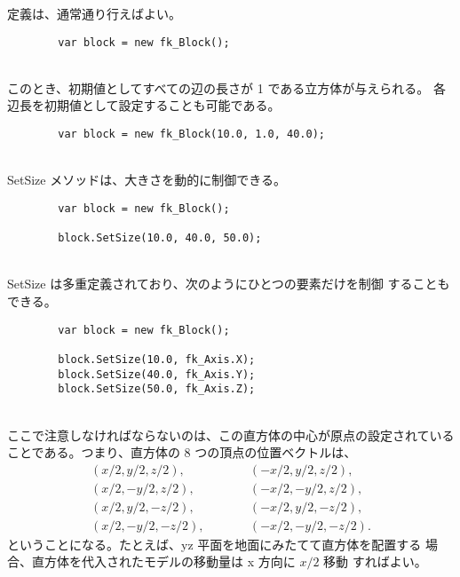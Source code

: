 定義は、通常通り行えばよい。
\\
\begin{screen}
\begin{verbatim}
        var block = new fk_Block();
\end{verbatim}
\end{screen}
~ \\
このとき、初期値としてすべての辺の長さが 1 である立方体が与えられる。
各辺長を初期値として設定することも可能である。
\\
\begin{screen}
\begin{verbatim}
        var block = new fk_Block(10.0, 1.0, 40.0);
\end{verbatim}
\end{screen}
~ \\
SetSize メソッドは、大きさを動的に制御できる。
\\
\begin{screen}
\begin{verbatim}
        var block = new fk_Block();

        block.SetSize(10.0, 40.0, 50.0);
\end{verbatim}
\end{screen}
~ \\
SetSize は多重定義されており、次のようにひとつの要素だけを制御
することもできる。
\\
\begin{breakbox}
\begin{verbatim}
        var block = new fk_Block();

        block.SetSize(10.0, fk_Axis.X);
        block.SetSize(40.0, fk_Axis.Y);
        block.SetSize(50.0, fk_Axis.Z);
\end{verbatim}
\end{breakbox}
~ \\
ここで注意しなければならないのは、この直方体の中心が原点の設定されている
ことである。つまり、直方体の 8 つの頂点の位置ベクトルは、
\begin{eqnarray*}
        (x/2, y/2, z/2), & \qquad & (-x/2, y/2, z/2), \\
        (x/2, -y/2, z/2), & \qquad & (-x/2, -y/2, z/2), \\
        (x/2, y/2, -z/2), & \qquad & (-x/2, y/2, -z/2), \\
        (x/2, -y/2, -z/2), & \qquad & (-x/2, -y/2, -z/2).
\end{eqnarray*}
ということになる。たとえば、yz 平面を地面にみたてて直方体を配置する
場合、直方体を代入されたモデルの移動量は x 方向に \(x/2\) 移動
すればよい。

